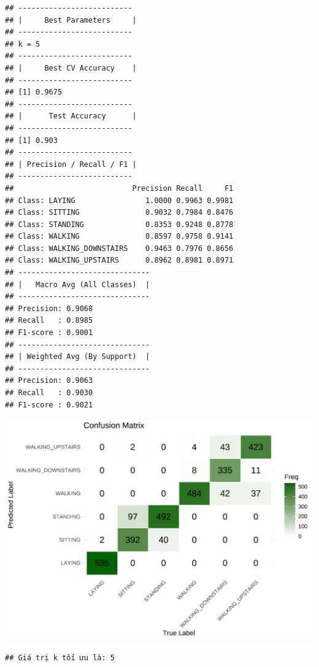 \documentclass[
]{article}
\newenvironment{Shaded}{\begin{snugshade}}{\end{snugshade}}
\newcommand{\FunctionTok}[1]{\textcolor[rgb]{0.13,0.29,0.53}{\textbf{#1}}}
\newcommand{\NormalTok}[1]{#1}
\newcommand{\OtherTok}[1]{\textcolor[rgb]{0.56,0.35,0.01}{#1}}
\newcommand{\SpecialCharTok}[1]{\textcolor[rgb]{0.81,0.36,0.00}{\textbf{#1}}}
\newcommand{\StringTok}[1]{\textcolor[rgb]{0.31,0.60,0.02}{#1}}
\begin{document}
\begin{verbatim}
## --------------------------
## |     Best Parameters     |
## --------------------------
## k = 5
## --------------------------
## |     Best CV Accuracy    |
## --------------------------
## [1] 0.9675
## --------------------------
## |      Test Accuracy      |
## --------------------------
## [1] 0.903
## --------------------------
## | Precision / Recall / F1 |
## --------------------------
##                           Precision Recall     F1
## Class: LAYING                1.0000 0.9963 0.9981
## Class: SITTING               0.9032 0.7984 0.8476
## Class: STANDING              0.8353 0.9248 0.8778
## Class: WALKING               0.8597 0.9758 0.9141
## Class: WALKING_DOWNSTAIRS    0.9463 0.7976 0.8656
## Class: WALKING_UPSTAIRS      0.8962 0.8981 0.8971
## ------------------------------
## |   Macro Avg (All Classes)  |
## ------------------------------
## Precision: 0.9068
## Recall   : 0.8985
## F1-score : 0.9001
## ------------------------------
## | Weighted Avg (By Support)  |
## ------------------------------
## Precision: 0.9063
## Recall   : 0.9030
## F1-score : 0.9021
\end{verbatim}

\includegraphics{report_files/figure-latex/unnamed-chunk-29-1.pdf}

\begin{Shaded}
\end{Shaded}

\begin{verbatim}
## Giá trị k tối ưu là: 5
\end{verbatim}
\end{document}
